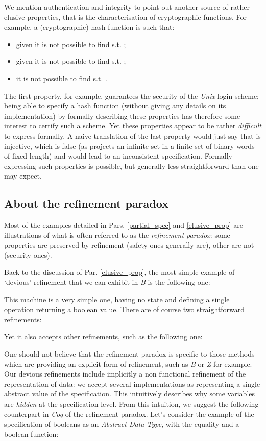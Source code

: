\documentclass[conference]{IEEEtran}
\begin{document}
We mention authentication and integrity to point out another source of rather elusive
properties, that is the characterisation of cryptographic functions. For example, a
(cryptographic) hash function {\small} is such that:
\begin{itemize}
\item given {\small} it is not possible to find {\small} s.t. {\small};
\item given {\small} it is not possible to find {\small} s.t.
{\small};
\item it is not possible to find {\small} s.t. {\small}.
\end{itemize}
The first property, for example, guarantees the security of the \emph{Unix} login scheme;
being able to specify a hash function (without giving any details on its implementation) by
formally describing these properties has therefore some interest to certify such a scheme. Yet
these properties appear to be rather \emph{difficult} to express formally. A naive translation
of the last property would just say that {\small} is injective, which is false (as
{\small} projects an infinite set in a finite set of binary words of fixed length) and
would lead to an inconsistent specification. Formally expressing such properties is possible,
but generally less straightforward than one may expect.

\subsection{About the refinement paradox}\label{refinement_paradox}

Most of the examples detailed in Pars. \ref{partial_spec} and \ref{elusive_prop} are
illustrations of what is often referred to as the \emph{refinement paradox}: some properties
are preserved by refinement (safety ones generally are), other are not (security ones).

Back to the discussion of Par. \ref{elusive_prop}, the most simple example of `devious'
refinement that we can exhibit in \emph{B} is the following one:

This machine is a very simple one, having no state and defining a single operation
{\small} returning a boolean value. There are of course two straightforward
refinements:


Yet it also accepts other refinements, such as the following one:

One should not believe that the refinement paradox is specific to those methods which are
providing an explicit form of refinement, such as \emph{B} or \emph{Z} for example. Our
devious refinements include implicitly a non functional refinement of the representation of
data: we accept several implementations as representing a single abstract value of the
specification. This intuitively describes why some variables are \emph{hidden} at the
specification level. From this intuition, we suggest the following counterpart in \emph{Coq}
of the refinement paradox. Let's consider the example of the specification of booleans as an
\emph{Abstract Data Type}, with the equality and a boolean function:
\end{document}

